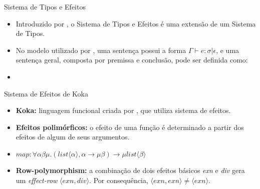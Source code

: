 \begin{frame}{Sistema de Tipos e Efeitos}
    \begin{itemize}
        \item Introduzido por , o Sistema de Tipos e Efeitos é uma extensão de um Sistema de Tipos.

        \item No modelo utilizado por , uma sentença possui a forma $\Gamma \vdash e:\sigma | \epsilon$, e uma sentença geral, composta por premissa e conclusão, pode ser definida como:

        \item [] \begin{prooftree}
            \end{prooftree}

    \end{itemize}
\end{frame}

\begin{frame}{Sistema de Efeitos de Koka}
    \begin{itemize}
        \item \textbf{Koka:} linguagem funcional criada por , que utiliza sistema de efeitos.
    
        \item \textbf{Efeitos polimórficos:} o efeito de uma função é determinado a partir dos efeitos de algum de seus argumentos.

        \item [] \begin{center}
            $map : \forall \alpha \beta \mu . (list \langle \alpha \rangle, \alpha \rightarrow \mu \beta) \rightarrow \mu list \langle \beta \rangle$\\
        \end{center}

        \item \textbf{Row-polymorphism:} a combinação de dois efeitos básicos \textit{exn} e \textit{div} gera um \textit{effect-row} $\langle exn, div \rangle$. Por consequência, $\langle exn, exn \rangle \neq \langle exn\rangle$.
    \end{itemize}
\end{frame}